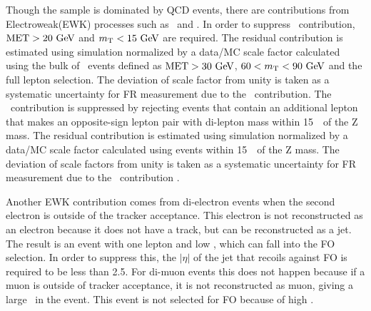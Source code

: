Though the sample is dominated by QCD 
events, there are contributions from Electroweak(EWK) processes such as \Wjets\ and \dyll. 
In order to suppress \Wjets\ contribution, $\mathrm{MET}>20~\mathrm{Ge\kern -0.1em V}$ and $m_{\mathrm{T}}<15~\mathrm{Ge\kern -0.1em V}$ are required. 
The residual contribution is estimated using simulation normalized by a data/MC scale factor 
calculated using the bulk of \Wjets\ events defined as $\mathrm{MET}>30~\mathrm{Ge\kern -0.1em V}$, $60<m_{\mathrm{T}}<90~\mathrm{Ge\kern -0.1em V}$ 
and the full lepton selection. The deviation of scale factor from unity 
is taken as a systematic uncertainty for FR measurement due to the \Wjets\ contribution.
The \dyll\ contribution is suppressed by rejecting events 
that contain an additional lepton that makes an opposite-sign lepton pair 
with di-lepton mass within 15~\GeV\ of the Z mass.  
The residual contribution is estimated using simulation normalized by a data/MC scale factor
calculated using events within 15~\GeV\ of the Z mass.
The deviation of scale factors from unity
is taken as a systematic uncertainty for FR measurement due to the \dyll\ contribution .

Another EWK contribution comes from di-electron events when the second electron 
is outside of the tracker acceptance. This electron is not reconstructed 
as an electron because it does not have a track, but can be reconstructed 
as a jet. The result is an event with one lepton and low \met, which 
can fall into the FO selection. In order to suppress this, the $\left| \eta \right|$ 
of the jet that recoils against FO is required to be less than 2.5. For di-muon events 
this does not happen because if a muon is outside of tracker acceptance, 
it is not reconstructed as muon, giving a large \met\ in the event. 
This event is not selected for FO because of high \met. 

